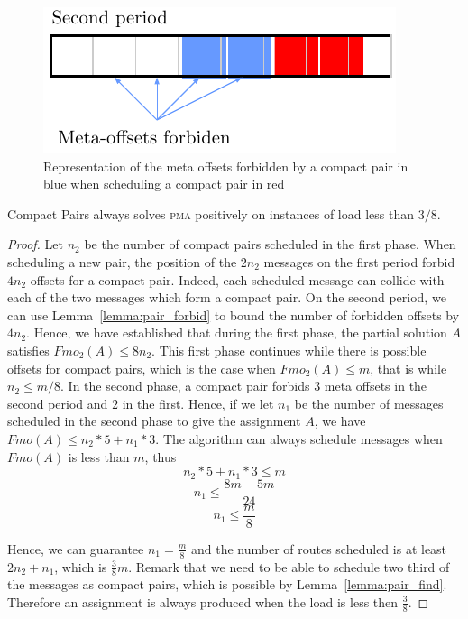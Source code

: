 \documentclass[a4paper,UKenglish,cleveref, autoref, thm-restate]{lipics-v2019}
\newcommand\pma{\textsc{pma}\xspace}
\begin{document}
\begin{figure}
\begin{center}
\includegraphics[scale=0.7]{pairforbiden}
\end{center}

\caption{Representation of the meta offsets forbidden by a compact pair in blue when scheduling a compact pair in red} 
\label{fig:forbidenmeta}
\end{figure}
\begin{theorem}
Compact Pairs always solves \pma positively on instances of load less than
$3/8$.
\end{theorem}
\begin{proof}
Let $n_2$ be the number of compact pairs scheduled in the first phase. When scheduling a new pair, the position of the $2n_2$ messages on the first period forbid $4n_2$ offsets for a compact pair. Indeed, each scheduled message can collide
with each of the two messages which form a compact pair. On the second period, we can use Lemma~\ref{lemma:pair_forbid} to bound the number of forbidden offsets by $4n_2$. 
Hence, we have established that during the first phase, the partial solution $A$
satisfies $Fmo_2(A) \leq 8n_2$. This first phase continues while there is possible offsets for compact pairs, which is the case when $Fmo_2(A) \leq m$, that is while $n_2 \leq m/8$.
In the second phase, a compact pair forbids $3$ meta offsets in the 
second period and $2$ in the first. Hence, if we let $n_1$ be the number of messages scheduled in the second phase to give the assignment $A$, we have $Fmo(A) \leq n_2*5 + n_1*3$. 
The algorithm can always schedule messages when $Fmo(A)$ is less than $m$, thus
$$ n_2*5 + n_1*3 \leq m$$
$$ n_1 \leq \frac{8m - 5m }{24}$$
$$n_1 \leq \frac{m}{8}$$

Hence, we can guarantee $n_1 = \frac{m}{8}$ and the number of routes scheduled is at least $2n_2 + n_1$,
which is $\frac{3}{8}m$. Remark that we need to be able to schedule two third of the messages as compact pairs, which is possible by Lemma~\ref{lemma:pair_find}. Therefore an assignment is always produced when the load is less then $\frac{3}{8}$.
\end{proof}
\end{document}
